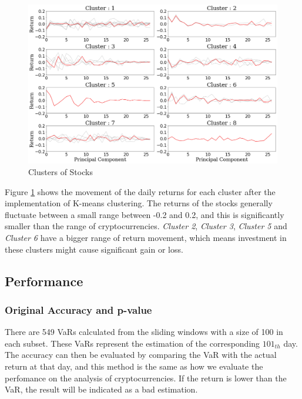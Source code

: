 \documentclass[11pt]{article} %
\theoremstyle{plain}
\theoremstyle{definition}
\begin{document}
\begin{figure}[ht]
    \includegraphics[width=1\linewidth, center]{resources/stock_kmeans.png}
    \caption{Clusters of Stocks}
    \label{fig:stockkmeans}
\end{figure}

Figure \ref{fig:stockkmeans} shows the movement of the daily returns for each cluster after the implementation of K-means clustering. The returns of the stocks generally fluctuate between a small range between -0.2 and 0.2, and this is significantly smaller than the range of cryptocurrencies. \textsl{Cluster 2}, \textsl{Cluster 3}, \textsl{Cluster 5} and \textsl{Cluster 6} have a bigger range of return movement, which means investment in these clusters might cause significant gain or loss.

\subsection{Performance}

\subsubsection{Original Accuracy and p-value}

There are 549 VaRs calculated from the sliding windows with a size of 100 in each subset. These VaRs represent the estimation of the corresponding $101_{th}$ day. The accuracy can then be evaluated by comparing the VaR with the actual return at that day, and this method is the same as how we evaluate the perfomance on the analysis of cryptocurrencies. If the return is lower than the VaR, the result will be indicated as a bad estimation.
\end{document}
